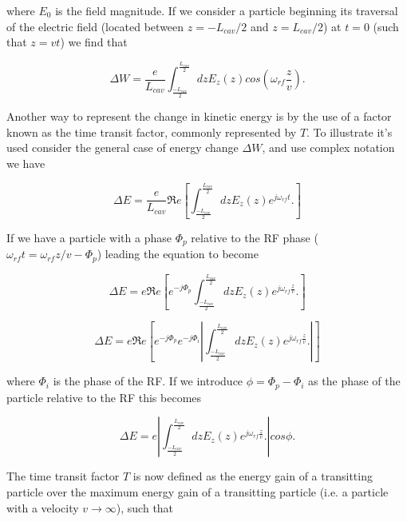 where $E_{0}$ is the field magnitude. If we consider a particle beginning its traversal of the electric field (located between $z=-L_{cav}/2$ and $z=L_{cav}/2$) at $t=0$ (such that $z=vt$) we find that

\begin{equation}
\Delta W = \frac{e}{L_{cav}} \int^{\frac{L_{cav}}{2}}_{\frac{-L_{cav}}{2}} dz E_{z}\left( z \right) cos \left( \omega_{rf} \frac{z}{v} \right).
\end{equation}

Another way to represent the change in kinetic energy is by the use of a factor known as the time transit factor, commonly represented by $T$. To illustrate it's used consider the general case of energy change $\Delta W$, and use complex notation we have

\begin{equation}
\Delta E = \frac{e}{L_{cav}} \Re{}e \left[ \int^{\frac{L_{cav}}{2}}_{\frac{-L_{cav}}{2}} dz E_{z}\left( z \right)e^{j \omega_{rf} t}.\right]
\end{equation}

If we have a particle with a phase $\Phi_{p}$ relative to the RF phase ($\omega_{rf}t = \omega_{rf}z/v - \Phi_{p}$) leading the equation to become

\begin{equation}
\Delta E = e \Re{}e \left[ e^{-j \Phi_{p}}\int^{\frac{L_{cav}}{2}}_{\frac{-L_{cav}}{2}} dz E_{z}\left( z \right) e^{j \omega_{rf} \frac{z}{v}}.\right]
\end{equation}

\begin{equation}
\Delta E = e \Re{}e \left[ e^{-j \Phi_{p}} e^{-j \Phi_{i}} \left| \int^{\frac{L_{cav}}{2}}_{\frac{-L_{cav}}{2}} dz E_{z}\left( z \right) e^{j \omega_{rf} \frac{z}{v}}.\right| \right]
\end{equation}

where $\Phi_{i}$ is the phase of the RF. If we introduce $\phi = \Phi_{p} - \Phi_{i}$ as the phase of the particle relative to the RF this becomes

\begin{equation}
\Delta E = e  \left| \int^{\frac{L_{cav}}{2}}_{\frac{-L_{cav}}{2}} dz E_{z}\left( z \right) e^{j \omega_{rf} \frac{z}{v}}.\right| cos \phi.
\end{equation}

The time transit factor $T$ is now defined as the energy gain of a transitting particle over the maximum energy gain of a transitting particle (i.e. a particle with a velocity $v \rightarrow \infty $), such that 

